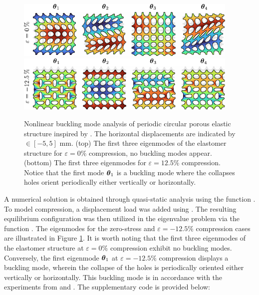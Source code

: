 \begin{example}
\begin{figure}[!t]
    \centering
\includegraphics*[width=0.95\textwidth]{./pdf/thesis-figure-6-6-1.pdf} \\[0.5em]
\includegraphics*[width=0.95\textwidth]{./pdf/thesis-figure-6-6-2.pdf}
%
\caption{Nonlinear buckling mode analysis of periodic circular porous elastic structure inspired by \cite{Bertoldi2008Feb,Overvelde2012May}. The horizontal displacements are indicated by \protect{}$\!\!\in [-5,5]$ \si{\milli \meter}. (top) The first three eigenmodes of the elastomer structure for $\varepsilon = 0\%$ compression, no buckling modes appear. (bottom)  The first three eigenmodes for $\varepsilon = 12.5\%$ compression. Notice that the first mode ${\boldsymbol{\theta}}_1$ is a buckling mode where the collapses holes orient periodically either vertically or horizontally. }
\label{fig:C5:fig_bucklemode}
\vspace{-3mm}
\end{figure}

A numerical solution is obtained through quasi-static analysis using the function . To model compression, a displacement load was added using . The resulting equilibrium configuration was then utilized in the eigenvalue problem via the function . The eigenmodes for the zero-stress and $\varepsilon = -12.5\%$ compression cases are illustrated in Figure \ref{fig:C5:fig_bucklemode}. It is worth noting that the first three eigenmodes of the elastomer structure at $\varepsilon = 0\%$ compression exhibit no buckling modes. Conversely, the first eigenmode ${\boldsymbol{\theta}}_1$ at $\varepsilon = -12.5\%$ compression displays a buckling mode, wherein the collapse of the holes is periodically oriented either vertically or horizontally. This buckling mode is in accordance with the experiments from \cite{Overvelde2012May} and \cite{Bertoldi2008Feb}. The supplementary code is provided below: 
\end{example}
%

